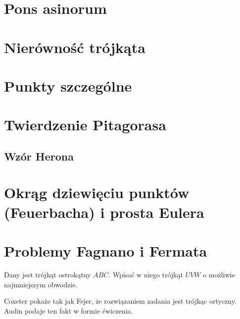 

\section{Pons asinorum}


\section{Nierówność trójkąta}


\section{Punkty szczególne}


\section{Twierdzenie Pitagorasa}


\subsection{Wzór Herona}


\section{Okrąg dziewięciu punktów (Feuerbacha) i prosta Eulera}


\section{Problemy Fagnano i Fermata}

\begin{problem}
	Dany jest trójkąt ostrokątny $ABC$.
	Wpisać w niego trójkąt $UVW$ o możliwie najmniejszym obwodzie.
%
\end{problem}

Coxeter \cite[s. 36, 37]{coxeter_1967} pokaże tak jak Fejer, że rozwiązaniem zadania jest trójkąc ortyczny.
Audin \cite[s. 101]{audin_2003} podaje ten fakt w formie ćwiczenia. %

